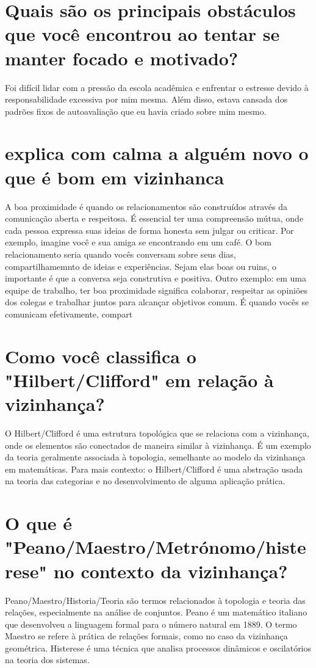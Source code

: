 \documentclass[11pt,a4paper]{article}
\begin{document}
\section{Quais são os principais obstáculos que você encontrou ao tentar se manter focado e motivado?}
Foi difícil lidar com a pressão da escola acadêmica e enfrentar o estresse devido à responsabilidade excessiva por mim mesma. Além disso, estava cansada dos padrões fixos de autoavaliação que eu havia criado sobre mim mesmo.

\section{explica com calma a alguém novo o que é bom em vizinhanca}
A boa proximidade é quando os relacionamentos são construídos através da comunicação aberta e respeitosa. É essencial ter uma compreensão mútua, onde cada pessoa expressa suas ideias de forma honesta sem julgar ou criticar. Por exemplo, imagine você e sua amiga se encontrando em um café. O bom relacionamento seria quando vocês conversam sobre seus dias, compartilhamemnto de ideias e experiências. Sejam elas boas ou ruins, o importante é que a conversa seja construtiva e positiva. Outro exemplo: em uma equipe de trabalho, ter boa proximidade significa colaborar, respeitar as opiniões dos colegas e trabalhar juntos para alcançar objetivos comum. É quando vocês se comunicam efetivamente, compart

\section{Como você classifica o "Hilbert/Clifford" em relação à vizinhança?}
O Hilbert/Clifford é uma estrutura topológica que se relaciona com a vizinhança, onde os elementos são conectados de maneira similar à vizinhança. É um exemplo da teoria geralmente associada à topologia, semelhante ao modelo da vizinhança em matemáticas. Para mais contexto: o Hilbert/Clifford é uma abstração usada na teoria das categorias e no desenvolvimento de alguma aplicação prática.

\section{O que é "Peano/Maestro/Metrónomo/histerese" no contexto da vizinhança?}
Peano/Maestro/Historia/Teoria são termos relacionados à topologia e teoria das relações, especialmente na análise de conjuntos. Peano é um matemático italiano que desenvolveu a linguagem formal para o número natural em 1889. O termo Maestro se refere à prática de relações formais, como no caso da vizinhança geométrica. Histerese é uma técnica que analisa processos dinâmicos e oscilatórios na teoria dos sistemas.
\end{document}
